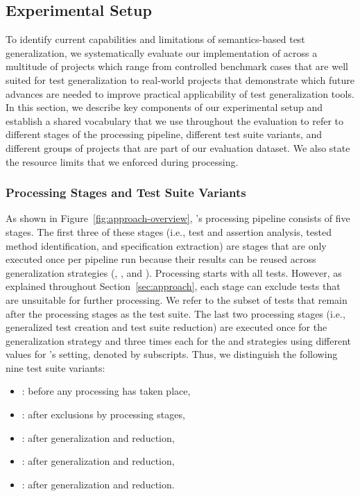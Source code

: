 \subsection{Experimental Setup}%
\label{sec:experimental-framework}

To identify current capabilities and limitations
of semantics-based test generalization,
we systematically evaluate our implementation of \ToolTeralizer{}
across a multitude of projects which range from
controlled benchmark cases that are well suited for test generalization
to real-world projects that demonstrate which future advances are needed
to improve practical applicability of test generalization tools.
In this section, we describe key components of our experimental setup
and establish a shared vocabulary
that we use throughout the evaluation
to refer to different stages of the processing pipeline,
different test suite variants,
and different groups of projects
that are part of our evaluation dataset.
We also state the resource limits that we enforced during processing.

\subsubsection{Processing Stages and Test Suite Variants}

As shown in Figure~\ref{fig:approach-overview},
\ToolTeralizer{}'s processing pipeline consists of five stages.
The first three of these stages
(i.e., test and assertion analysis, tested method identification, and specification extraction)
are \VariantShared{} stages that are only executed once per pipeline run
because their results can be reused across generalization strategies
(\VariantBaseline{}, \VariantNaive{}, and \VariantImproved{}).
Processing starts with all \VariantOriginal{} tests.
However, as explained throughout Section~\ref{sec:approach}, each stage can exclude tests
that are unsuitable for further processing.
We refer to the subset of \VariantOriginal{} tests that remain after
the \VariantShared{} processing stages
as the \VariantInitial{} test suite.
The last two processing stages
(i.e., generalized test creation and test suite reduction)
are executed once for the \VariantBaseline{} generalization strategy
and three times each for the \VariantNaive{} and \VariantImproved{} strategies
using different values for \ToolJqwik{}'s \tries{} setting, denoted by subscripts.
Thus, we distinguish the following nine test suite variants:

\begin{itemize}
  \item \VariantOriginal{}: before any processing has taken place,
  \item \VariantInitial{}: after exclusions by \VariantShared{} processing stages,
  \item \VariantBaseline{}: after \VariantBaseline{} generalization and reduction,
  \item \VariantNaives{}: after \VariantNaive{} generalization and reduction,
  \item \VariantImproveds{}: after \VariantImproved{} generalization and reduction.
\end{itemize}

